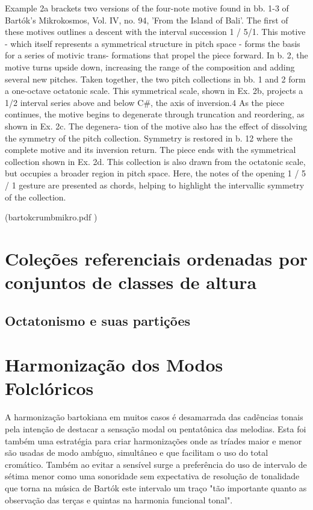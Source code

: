\documentclass[
	12pt,				%
	openright,			%
	twoside,			%
	a4paper,			%
	english,			%
	french,				%
	spanish,			%
	brazil				%
	]{abntex2}
\begin{document}
Example 2a brackets two versions of the four-note motive found in
bb. 1-3 of Bartók's Mikrokosmos, Vol. IV, no. 94, 'From the Island of
Bali'. The first of these motives outlines a descent with the interval
succession 1 / 5/1. This motive - which itself represents a symmetrical
structure in pitch space - forms the basis for a series of motivic trans-
formations that propel the piece forward. In b. 2, the motive turns
upside down, increasing the range of the composition and adding
several new pitches. Taken together, the two pitch collections in bb. 1
and 2 form a one-octave octatonic scale. This symmetrical scale, shown
in Ex. 2b, projects a 1/2 interval series above and below C\#, the axis of
inversion.4 As the piece continues, the motive begins to degenerate
through truncation and reordering, as shown in Ex. 2c. The degenera-
tion of the motive also has the effect of dissolving the symmetry of the
pitch collection. Symmetry is restored in b. 12 where the complete
motive and its inversion return. The piece ends with the symmetrical
collection shown in Ex. 2d. This collection is also drawn from the
octatonic scale, but occupies a broader region in pitch space. Here, the
notes of the opening 1 / 5 / 1 gesture are presented as chords, helping to
highlight the intervallic symmetry of the collection.

(bartokcrumbmikro.pdf )


\section{Coleções referenciais ordenadas por conjuntos de classes de altura}

\subsection{Octatonismo e suas partições}

\cite{cohn1991bartok}


\section{Harmonização dos Modos Folclóricos}


A harmonização  bartokiana em muitos casos é desamarrada das cadências tonais pela intenção de destacar a sensação modal ou pentatônica das melodias. Esta foi também uma estratégia para criar harmonizações onde as tríades maior e menor são usadas de modo ambíguo, simultâneo e que facilitam o uso do total cromático. Também ao evitar a sensível surge a preferência do uso de intervalo de sétima menor como uma sonoridade sem expectativa de resolução de tonalidade que torna na música de Bartók este intervalo um traço "tão importante quanto as observação das terças e quintas na harmonia funcional tonal"\cite[p. 28]{antokoletz1984music}.
\end{document}
